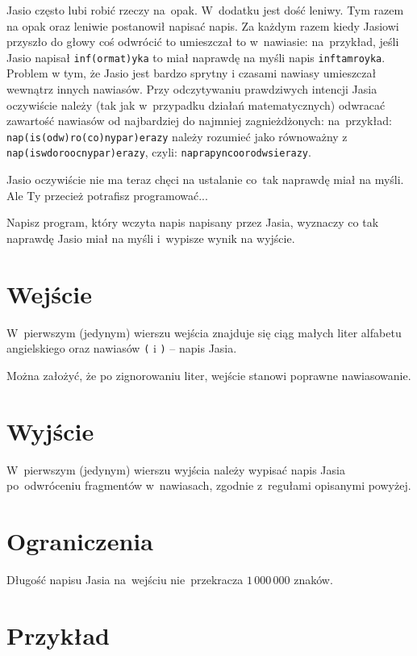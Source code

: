 \documentclass{solve}
\begin{document}

  Jasio często lubi robić rzeczy na~opak. W~dodatku jest dość leniwy. Tym razem
  na opak oraz leniwie postanowił napisać napis. Za każdym razem kiedy Jasiowi
  przyszło do głowy coś odwrócić to umieszczał to w~nawiasie: na~przykład, jeśli
  Jasio napisał \texttt{inf(ormat)yka} to miał naprawdę na myśli napis
  \texttt{inftamroyka}. Problem w tym, że Jasio jest bardzo sprytny i czasami
  nawiasy umieszczał wewnątrz innych nawiasów. Przy odczytywaniu prawdziwych
  intencji Jasia oczywiście należy (tak jak w~przypadku działań matematycznych)
  odwracać zawartość nawiasów od najbardziej do najmniej zagnieżdżonych:
  na~przykład: \texttt{nap(is(odw)ro(co)nypar)erazy} należy rozumieć jako
  równoważny z \texttt{nap(iswdoroocnypar)erazy}, czyli:
  \texttt{naprapyncoorodwsierazy}.

  Jasio oczywiście nie ma teraz chęci na ustalanie co~tak naprawdę miał
  na myśli. Ale Ty przecież potrafisz programować...

  Napisz program, który wczyta napis napisany przez Jasia, wyznaczy co tak
  naprawdę Jasio miał na myśli i~wypisze wynik na wyjście.

	\section{Wejście}
  W~pierwszym (jedynym) wierszu wejścia znajduje się ciąg małych liter alfabetu
  angielskiego oraz nawiasów \texttt{(} i \texttt{)} -- napis Jasia.

  Można założyć, że po zignorowaniu liter, wejście stanowi poprawne
  nawiasowanie.

	\section{Wyjście}
  W~pierwszym (jedynym) wierszu wyjścia należy wypisać napis Jasia po~odwróceniu
  fragmentów w~nawiasach, zgodnie z~regułami opisanymi powyżej.

  \section{Ograniczenia}
  Długość napisu Jasia na~wejściu nie~przekracza $1\,000\,000$ znaków.

	\section{Przykład}
\end{document}
